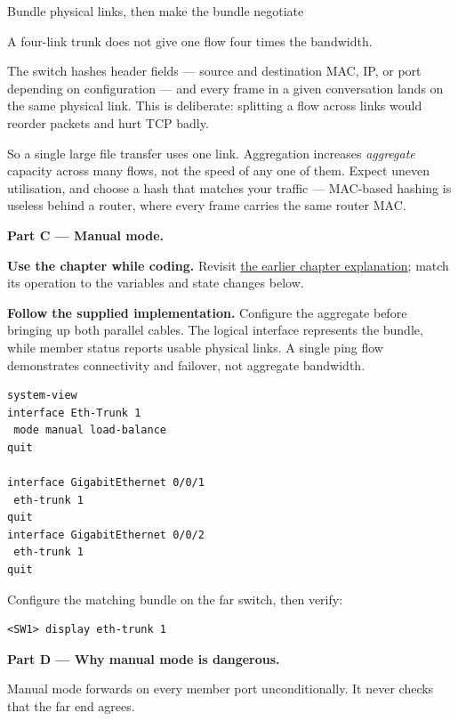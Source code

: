 \begin{labproject}{Bundle physical links, then make the bundle negotiate}
\begin{pitfall}
A four-link trunk does not give one flow four times the bandwidth.

The switch hashes header fields --- source and destination MAC, IP, or port depending on configuration --- and every frame in a given conversation lands on the same physical link. This is deliberate: splitting a flow across links would reorder packets and hurt TCP badly.

So a single large file transfer uses one link. Aggregation increases \emph{aggregate} capacity across many flows, not the speed of any one of them. Expect uneven utilisation, and choose a hash that matches your traffic --- MAC-based hashing is useless behind a router, where every frame carries the same router MAC.
\end{pitfall}

\medskip\noindent\textbf{Part C --- Manual mode.}\par




\textbf{Use the chapter while coding.} Revisit \hyperref[ch:lacp]{the earlier chapter explanation}; match its operation to the variables and state changes below.

\textbf{Follow the supplied implementation.} Configure the aggregate before bringing up both parallel cables. The logical interface represents the bundle, while member status reports usable physical links. A single ping flow demonstrates connectivity and failover, not aggregate bandwidth.


\begin{lstlisting}[style=utpterminal]
system-view
interface Eth-Trunk 1
 mode manual load-balance
quit

interface GigabitEthernet 0/0/1
 eth-trunk 1
quit
interface GigabitEthernet 0/0/2
 eth-trunk 1
quit
\end{lstlisting}

Configure the matching bundle on the far switch, then verify:

\begin{lstlisting}[style=utpterminal]
<SW1> display eth-trunk 1
\end{lstlisting}

\medskip\noindent\textbf{Part D --- Why manual mode is dangerous.}\par
Manual mode forwards on every member port unconditionally. It never checks that the far end agrees.


\end{labproject}
